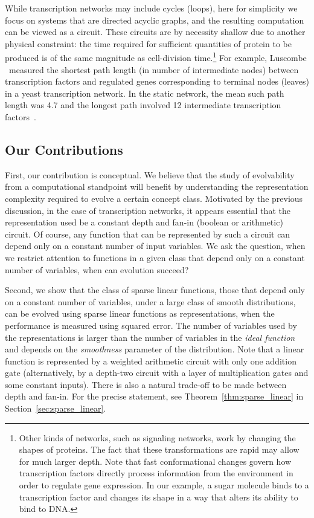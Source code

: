 While transcription networks may include cycles (loops), here for simplicity we
focus on systems that are directed acyclic graphs, and the resulting computation
can be viewed as a circuit. These circuits are by necessity shallow due to
another physical constraint: the time required for sufficient quantities of
protein to be produced is of the same magnitude as cell-division
time.\footnote{Other kinds of networks, such as signaling networks, work by
changing the shapes of proteins. The fact that these transformations are rapid may
allow for much larger depth. Note that fast conformational changes govern how
transcription factors directly process information from the environment in order
to regulate gene expression.  In our example, a sugar molecule binds to a
transcription factor and changes its shape in a way that alters its ability to
bind to DNA.}
For example, Luscombe \etal~measured the shortest path length (in number of
intermediate nodes) between transcription factors and regulated genes
corresponding to terminal nodes (leaves) in a yeast transcription network. In
the static network, the mean such path length was 4.7 and the longest path
involved 12 intermediate transcription factors~\cite{Luscombe:2004}.

\subsection{Our Contributions}

First, our contribution is conceptual. We believe that the study of evolvability from
a computational standpoint will benefit by understanding the representation
complexity required to evolve a certain concept class. Motivated by the previous
discussion, in the case of transcription networks, it appears essential that the
representation used be a constant depth and fan-in (boolean or arithmetic)
circuit. Of course, any function that can be represented by such a circuit can
depend only on a constant number of input variables. We ask the
question, when we restrict attention to functions in a given class that depend
only on a constant number of variables, when can evolution succeed?

Second, we show that the class of sparse linear functions, those that depend
only on a constant number of variables, under a large class of smooth
distributions, can be evolved using sparse linear functions as representations,
when the performance is measured using squared error. The number of variables
used by the representations is larger than the number of variables in the
\emph{ideal function} and depends on the \emph{smoothness} parameter of the
distribution.  Note that a linear function is represented by a weighted
arithmetic circuit with only one addition gate (alternatively, by a depth-two
circuit with a layer of multiplication gates and some constant inputs). There
is also a natural trade-off to be made between depth and fan-in. For the
precise statement, see Theorem~\ref{thm:sparse_linear} in
Section~\ref{sec:sparse_linear}.

